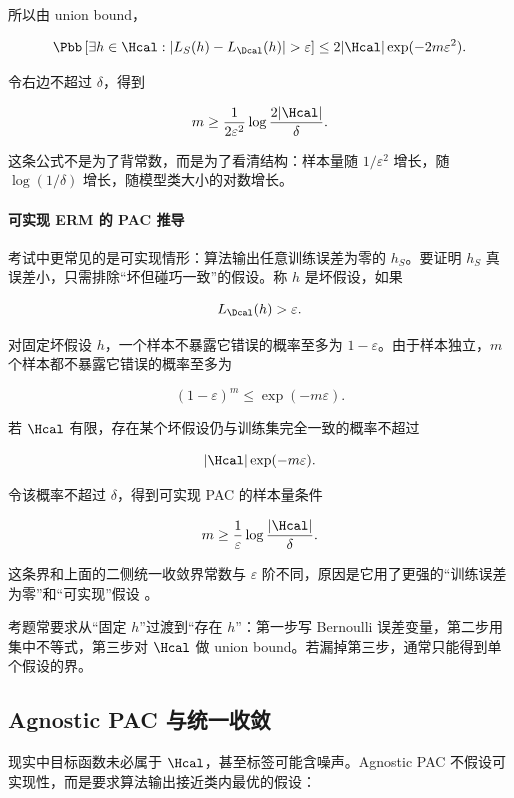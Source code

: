 所以由 union bound，

\[
  \Pbb\left[
    \exists h\in\Hcal:
    |L_S(h)-L_{\Dcal}(h)|>\varepsilon
  \right]
  \le
  2|\Hcal|\exp(-2m\varepsilon^2).
\]

令右边不超过 \(\delta\)，得到

\[
  m
  \ge
  \frac{1}{2\varepsilon^2}
  \log\frac{2|\Hcal|}{\delta}.
\]

这条公式不是为了背常数，而是为了看清结构：样本量随 \(1/\varepsilon^2\) 增长，随 \(\log(1/\delta)\) 增长，随模型类大小的对数增长。

\paragraph{可实现 ERM 的 PAC 推导}

考试中更常见的是可实现情形：算法输出任意训练误差为零的 \(h_S\)。要证明 \(h_S\) 真误差小，只需排除“坏但碰巧一致”的假设。称 \(h\) 是坏假设，如果

\[
  L_{\Dcal}(h)>\varepsilon.
\]

对固定坏假设 \(h\)，一个样本不暴露它错误的概率至多为 \(1-\varepsilon\)。由于样本独立，\(m\) 个样本都不暴露它错误的概率至多为

\[
  (1-\varepsilon)^m
  \le
  \exp(-m\varepsilon).
\]

若 \(\Hcal\) 有限，存在某个坏假设仍与训练集完全一致的概率不超过

\[
  |\Hcal|\exp(-m\varepsilon).
\]

令该概率不超过 \(\delta\)，得到可实现 PAC 的样本量条件

\[
  m
  \ge
  \frac{1}{\varepsilon}
  \log\frac{|\Hcal|}{\delta}.
\]

这条界和上面的二侧统一收敛界常数与 \(\varepsilon\) 阶不同，原因是它用了更强的“训练误差为零”和“可实现”假设 \parencite{shalev2014uml,mohri2018foundations}。

\examnote
考题常要求从“固定 \(h\)”过渡到“存在 \(h\)”：第一步写 Bernoulli 误差变量，第二步用集中不等式，第三步对 \(\Hcal\) 做 union bound。若漏掉第三步，通常只能得到单个假设的界。

\subsection{Agnostic PAC 与统一收敛}


现实中目标函数未必属于 \(\Hcal\)，甚至标签可能含噪声。Agnostic PAC 不假设可实现性，而是要求算法输出接近类内最优的假设：

